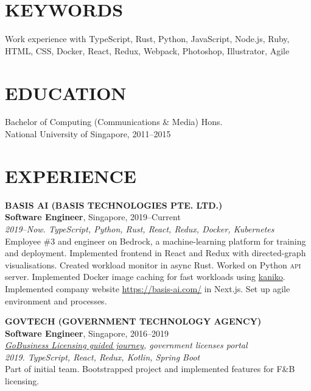\documentclass[line, margin]{res}
\makeatletter
\newcommand{\at}[0]{@}
\makeatother
\begin{document}
\address{
    \href{mailto:ng.guoyou+cv\at gmail.com}{ng.guoyou\at gmail.com}
    \href{https://github.com/gyng}{https://github.com/gyng}
    \href{https://www.linkedin.com/in/guoyou}{https://www.linkedin.com/in/guoyou}
}

\begin{resume}
    \section{KEYWORDS}
        Work experience with TypeScript, Rust, Python, JavaScript, Node.js, Ruby, HTML, CSS, Docker, React, Redux, Webpack, Photoshop, Illustrator, Agile

    \section{EDUCATION}
        Bachelor of Computing (Communications \& Media) Hons. \\
        National University of Singapore, 2011--2015

    \section{EXPERIENCE}
        \textbf{BASIS AI (BASIS TECHNOLOGIES PTE. LTD.)} \\
        \textbf{Software Engineer}, Singapore, 2019--Current \\
        \textit{2019--Now. TypeScript, Python, Rust, React, Redux, Docker, Kubernetes} \\
        Employee \#3 and engineer on Bedrock, a machine-learning platform for training and deployment.
        Implemented frontend in React and Redux with directed-graph visualisations.
        Created workload monitor in async Rust. Worked on Python \textsc{api} server.
        Implemented Docker image caching for fast workloads using \href{https://github.com/GoogleContainerTools/kaniko}{kaniko}.
        Implemented company website \href{https://basis-ai.com/}{https://basis-ai.com/} in Next.js.
        Set up agile environment and processes.

        \textbf{GOVTECH (GOVERNMENT TECHNOLOGY AGENCY)} \\
        \textbf{Software Engineer}, Singapore, 2016--2019 \\
        \textit{\href{https://www.gobusiness.gov.sg/licences/foodservices}{GoBusiness Licensing guided journey}, government licenses portal} \\
        \textit{2019. TypeScript, React, Redux, Kotlin, Spring Boot} \\
        Part of initial team. Bootstrapped project and implemented features for F\&B licensing.


\end{resume}
\end{document}
